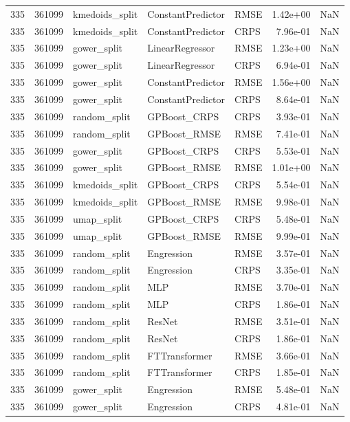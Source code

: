 \begin{tabular}{rrlllrr}
335 & 361099 & kmedoids\_split & ConstantPredictor & RMSE & 1.42e+00 & NaN \\
335 & 361099 & kmedoids\_split & ConstantPredictor & CRPS & 7.96e-01 & NaN \\
335 & 361099 & gower\_split & LinearRegressor & RMSE & 1.23e+00 & NaN \\
335 & 361099 & gower\_split & LinearRegressor & CRPS & 6.94e-01 & NaN \\
335 & 361099 & gower\_split & ConstantPredictor & RMSE & 1.56e+00 & NaN \\
335 & 361099 & gower\_split & ConstantPredictor & CRPS & 8.64e-01 & NaN \\
335 & 361099 & random\_split & GPBoost\_CRPS & CRPS & 3.93e-01 & NaN \\
335 & 361099 & random\_split & GPBoost\_RMSE & RMSE & 7.41e-01 & NaN \\
335 & 361099 & gower\_split & GPBoost\_CRPS & CRPS & 5.53e-01 & NaN \\
335 & 361099 & gower\_split & GPBoost\_RMSE & RMSE & 1.01e+00 & NaN \\
335 & 361099 & kmedoids\_split & GPBoost\_CRPS & CRPS & 5.54e-01 & NaN \\
335 & 361099 & kmedoids\_split & GPBoost\_RMSE & RMSE & 9.98e-01 & NaN \\
335 & 361099 & umap\_split & GPBoost\_CRPS & CRPS & 5.48e-01 & NaN \\
335 & 361099 & umap\_split & GPBoost\_RMSE & RMSE & 9.99e-01 & NaN \\
335 & 361099 & random\_split & Engression & RMSE & 3.57e-01 & NaN \\
335 & 361099 & random\_split & Engression & CRPS & 3.35e-01 & NaN \\
335 & 361099 & random\_split & MLP & RMSE & 3.70e-01 & NaN \\
335 & 361099 & random\_split & MLP & CRPS & 1.86e-01 & NaN \\
335 & 361099 & random\_split & ResNet & RMSE & 3.51e-01 & NaN \\
335 & 361099 & random\_split & ResNet & CRPS & 1.86e-01 & NaN \\
335 & 361099 & random\_split & FTTransformer & RMSE & 3.66e-01 & NaN \\
335 & 361099 & random\_split & FTTransformer & CRPS & 1.85e-01 & NaN \\
335 & 361099 & gower\_split & Engression & RMSE & 5.48e-01 & NaN \\
335 & 361099 & gower\_split & Engression & CRPS & 4.81e-01 & NaN \\

\end{tabular}
